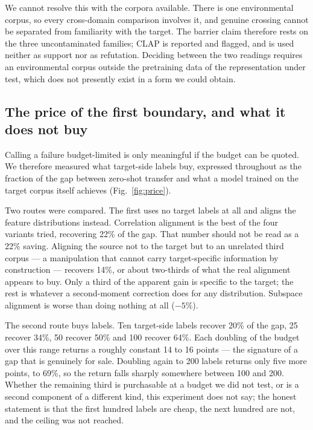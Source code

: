 We cannot resolve this with the corpora available. There is one environmental
corpus, so every cross-domain comparison involves it, and genuine crossing cannot
be separated from familiarity with the target. The barrier claim therefore rests on
the three uncontaminated families; CLAP is reported and flagged, and is used
neither as support nor as refutation. Deciding between the two readings requires an
environmental corpus outside the pretraining data of the representation under test,
which does not presently exist in a form we could obtain.

\subsection*{The price of the first boundary, and what it does not buy}

Calling a failure budget-limited is only meaningful if the budget can be quoted. We
therefore measured what target-side labels buy, expressed throughout as the
fraction of the gap between zero-shot transfer and what a model trained on the
target corpus itself achieves (Fig.~\ref{fig:price}).

Two routes were compared. The first uses no target labels at all and aligns the
feature distributions instead. Correlation alignment is the best of the four
variants tried, recovering 22\% of the gap. That number should not be read as a
22\% saving. Aligning the source not to the target but to an unrelated third corpus
--- a manipulation that cannot carry target-specific information by construction
--- recovers 14\%, or about two-thirds of what the real alignment appears to buy.
Only a third of the apparent gain is specific to the target; the rest is whatever a
second-moment correction does for any distribution. Subspace alignment is worse
than doing nothing at all ($-5\%$).

The second route buys labels. Ten target-side labels recover 20\% of the gap, 25
recover 34\%, 50 recover 50\% and 100 recover 64\%. Each doubling of the budget
over this range returns a roughly constant 14 to 16 points --- the signature of a
gap that is genuinely for sale. Doubling again to 200 labels returns only five more
points, to 69\%, so the return falls sharply somewhere between 100 and 200. Whether
the remaining third is purchasable at a budget we did not test, or is a second
component of a different kind, this experiment does not say; the honest statement
is that the first hundred labels are cheap, the next hundred are not, and the
ceiling was not reached.

